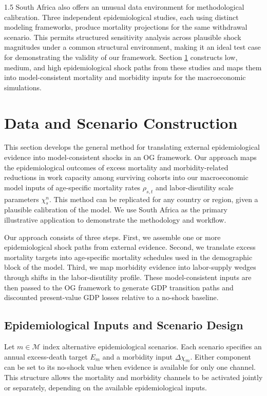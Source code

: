 \documentclass[letterpaper,12pt]{article}
\theoremstyle{definition}
\begin{document}
\begin{spacing}{1.5}
  South Africa also offers an unusual data environment for methodological calibration. Three independent epidemiological studies, each using distinct modeling frameworks, produce mortality projections for the same withdrawal scenario. This permits structured sensitivity analysis across plausible shock magnitudes under a common structural environment, making it an ideal test case for demonstrating the validity of our framework. Section \ref{SecData} constructs low, medium, and high epidemiological shock paths from these studies and maps them into model-consistent mortality and morbidity inputs for the macroeconomic simulations.


\section{Data and Scenario Construction}\label{SecData}

This section develops the general method for translating external epidemiological evidence into model-consistent shocks in an OG framework. Our approach maps the epidemiological outcomes of excess mortality and morbidity-related reductions in work capacity among surviving cohorts into our macroeconomic model inputs of age-specific mortality rates $\rho_{s,t}$ and labor-disutility scale parameters $\chi^n_s$. This method can be replicated for any country or region, given a plausible calibration of the model. We use South Africa as the primary illustrative application to demonstrate the methodology and workflow.

Our approach consists of three steps. First, we assemble one or more epidemiological shock paths from external evidence. Second, we translate excess mortality targets into age-specific mortality schedules used in the demographic block of the model. Third, we map morbidity evidence into labor-supply wedges through shifts in the labor-disutility profile. These model-consistent inputs are then passed to the OG framework to generate GDP transition paths and discounted present-value GDP losses relative to a no-shock baseline.

\subsection{Epidemiological Inputs and Scenario Design}

Let $m \in \mathcal{M}$ index alternative epidemiological scenarios. Each scenario specifies an annual excess-death target $E_m$ and a morbidity input $\Delta \chi_m$. Either component can be set to its no-shock value when evidence is available for only one channel. This structure allows the mortality and morbidity channels to be activated jointly or separately, depending on the available epidemiological inputs.


\end{spacing}
\end{document}
